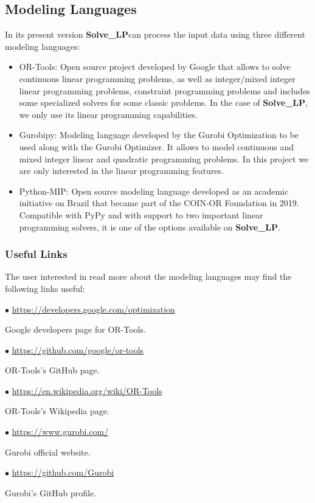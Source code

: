 \documentclass[12pt,hidelinks]{article}
\newcommand{\SolveLP}{\textbf{Solve\_LP}}
\begin{document}
	\subsection{Modeling Languages}
		In its present version \SolveLP can process the input data using three different modeling languages:
		\begin{itemize}
			\item OR-Tools: Open source project developed by Google that allows to solve continuous linear programming problems, as well as integer/mixed integer linear programming problems, constraint programming problems and includes some specialized solvers for some classic problems. In the case of \SolveLP, we only use its linear programming capabilities.
			\item Gurobipy: Modeling language developed by the Gurobi Optimization to be used along with the Gurobi Optimizer. It allows to model continuous and mixed integer linear and quadratic programming problems. In this project we are only interested in the linear programming features.
			\item Python-MIP: Open source modeling language developed as an academic initiative on Brazil that became part of the COIN-OR Foundation in 2019. Compatible with PyPy and with support to two important linear programming solvers, it is one of the options available on \SolveLP.
		\end{itemize}

	\subsubsection{Useful Links}
		The user interested in read more about the modeling languages may find the following links useful:

		$\bullet$ \url{https://developers.google.com/optimization}

		Google developers page for OR-Tools.

		$\bullet$ \url{https://github.com/google/or-tools}

		OR-Tools's GitHub page.

		$\bullet$ \url{https://en.wikipedia.org/wiki/OR-Tools}

		OR-Tools's Wikipedia page.

		$\bullet$ \url{https://www.gurobi.com/}

		Gurobi official website.

		$\bullet$ \url{https://github.com/Gurobi}

		Gurobi's GitHub profile.
\end{document}
